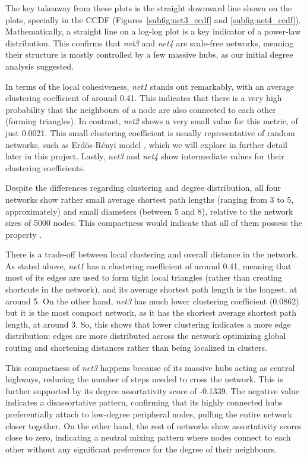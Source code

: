\documentclass{article}
\begin{document}
The key takeaway from these plots is the straight downward line shown on the plots, specially in the CCDF (Figures~\ref{subfig:net3_ccdf} and \ref{subfig:net4_ccdf}). Mathematically, a straight line on a log-log plot is a key indicator of a power-law distribution. This confirms that \textit{net3} and \textit{net4} are scale-free networks, meaning their structure is mostly controlled by a few massive hubs, as our initial degree analysis suggested.

In terms of the local cohesiveness, \textit{net1} stands out remarkably, with an average clustering coefficient of around 0.41. This indicates that there is a very high probability that the neighbours of a node are also connected to each other (forming triangles). In contrast, \textit{net2} shows a very small value for this metric, of just 0.0021. This small clustering coefficient is usually representative of random networks, such as Erdös-R\'enyi model \cite{albert2002statistical}, which we will explore in further detail later in this project. Lastly, \textit{net3} and \textit{net4} show intermediate values for their clustering coefficients.

Despite the differences regarding clustering and degree distribution, all four networks show rather small average shortest path lengths (ranging from 3 to 5, approximately) and small diameters (between 5 and 8), relative to the network sizes of 5000 nodes. This compactness would indicate that all of them possess the  property \cite{watts1998collective}. 

There is a trade-off between local clustering and overall distance in the network. As stated above, \textit{net1} has a clustering coefficient of around 0.41, meaning that most of its edges are used to form tight local triangles (rather than creating shortcuts in the network), and its average shortest path length is the longest, at around 5. On the other hand, \textit{net3} has much lower clustering coefficient (0.0862) but it is the most compact network, as it has the shortest average shortest path length, at around 3. So, this shows that lower clustering indicates a more  edge distribution: edges are more distributed across the network optimizing global routing and shortening distances rather than being localized in clusters.

This compactness of \textit{net3} happens because of its massive hubs acting as central highways, reducing the number of steps needed to cross the network. This is further supported by its degree assortativity score of -0.1339. The negative value indicates a disassortative pattern, confirming that its highly connected hubs preferentially attach to low-degree peripheral nodes, pulling the entire network closer together. On the other hand, the rest of networks show assortativity scores close to zero, indicating a neutral mixing pattern where nodes connect to each other without any significant preference for the degree of their neighbours.
\end{document}
